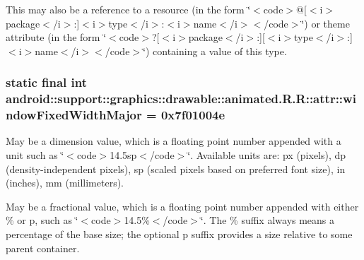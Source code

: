 This may also be a reference to a resource (in the form \char`\"{}$<$code$>$@\mbox{[}$<$i$>$package$<$/i$>$:\mbox{]}$<$i$>$type$<$/i$>$:$<$i$>$name$<$/i$>$$<$/code$>$\char`\"{}) or theme attribute (in the form \char`\"{}$<$code$>$?\mbox{[}$<$i$>$package$<$/i$>$:\mbox{]}\mbox{[}$<$i$>$type$<$/i$>$:\mbox{]}$<$i$>$name$<$/i$>$$<$/code$>$\char`\"{}) containing a value of this type. \hypertarget{classandroid_1_1support_1_1graphics_1_1drawable_1_1animated_1_1_r_1_1attr_782124100b9fa0c11d960f34a9cdf723}{
\subsubsection[{windowFixedWidthMajor}]{\setlength{\rightskip}{0pt plus 5cm}static final int android::support::graphics::drawable::animated.R.R::attr::windowFixedWidthMajor = 0x7f01004e}}
\label{classandroid_1_1support_1_1graphics_1_1drawable_1_1animated_1_1_r_1_1attr_782124100b9fa0c11d960f34a9cdf723}


May be a dimension value, which is a floating point number appended with a unit such as \char`\"{}$<$code$>$14.5sp$<$/code$>$\char`\"{}. Available units are: px (pixels), dp (density-independent pixels), sp (scaled pixels based on preferred font size), in (inches), mm (millimeters). 

May be a fractional value, which is a floating point number appended with either \% or p, such as \char`\"{}$<$code$>$14.5\%$<$/code$>$\char`\"{}. The \% suffix always means a percentage of the base size; the optional p suffix provides a size relative to some parent container. 

